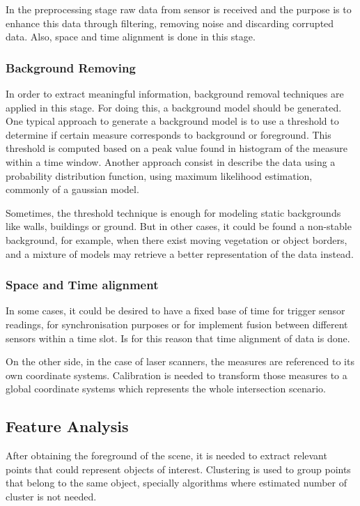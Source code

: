 \documentclass[10pt,twocolumn,letterpaper]{article}
\begin{document}
 In the preprocessing stage raw data from sensor is received and the purpose is to enhance this data through filtering, removing noise and discarding corrupted data. Also, space and time alignment is done in this stage.

\subsubsection{Background Removing}
 
In order to extract meaningful information, background removal techniques are applied in this stage. For doing this, a background model should be generated. One typical approach to generate a background model is to use a threshold to determine if certain measure corresponds to background or foreground. This threshold is computed based on a peak value found in histogram of the measure within a time window. Another approach consist in describe the data using a probability distribution function, using maximum likelihood estimation, commonly of a gaussian model.
 
Sometimes, the threshold technique is enough for modeling static backgrounds like walls, buildings or ground. But in other cases, it could be found a non-stable background, for example, when there exist moving vegetation or object borders, and a mixture of models may retrieve a better representation of the data instead.

\subsubsection{Space and Time alignment}

In some cases, it could be desired to have a fixed base of time for trigger sensor readings, for synchronisation purposes or for implement fusion between different sensors within a time slot. Is for this reason that time alignment of data is done.

On the other side, in the case of laser scanners, the measures are referenced to its own coordinate systems. Calibration is needed to transform those measures to a global coordinate systems which represents the whole intersection scenario. 

\subsection{Feature Analysis}

After obtaining the foreground of the scene, it is needed to extract relevant points that could represent objects of interest. Clustering is used to group points that belong to the same object, specially algorithms where estimated number of cluster is not needed. 
\end{document}
